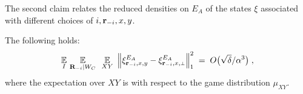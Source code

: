 The second claim relates the reduced densities on $E_A$ of the states $\xi$  associated with different choices of $i,\mathbf{r}_{-i},x,y$. 

\begin{claim}\label{claim:xi-change-y}
The following holds:
\begin{align}
\label{eq:E_A_1}
\Ex_I \, \Ex_{\bR_\mi |  W_C} \, \, \, \Ex_{XY} \,\, \Big \| \xi^{E_A}_\ssxy - \xi^{E_A}_\ssxp \Big \|_1^2\; = \; O\big(\sqrt{\delta}/\alpha^3 \big)\;,
\end{align}
where the expectation over $XY$ is with respect to the game distribution $\mu_{XY}$. 
\end{claim}

